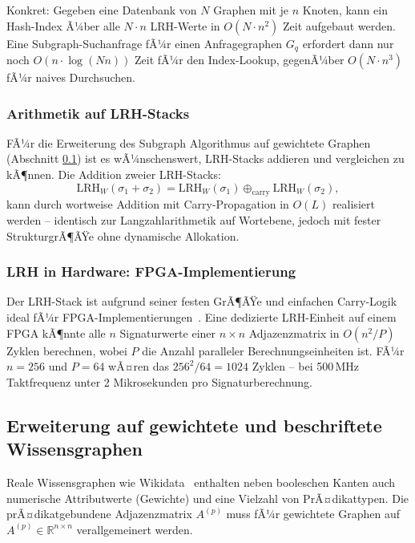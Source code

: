 ﻿\documentclass[a4paper,12pt]{article}
\theoremstyle{definition}
\begin{document}
Konkret: Gegeben eine Datenbank von $N$ Graphen mit je $n$ Knoten, kann ein
Hash-Index Ã¼ber alle $N \cdot n$ LRH-Werte in $O(N \cdot n^2)$ Zeit aufgebaut werden.
Eine Subgraph-Suchanfrage fÃ¼r einen Anfragegraphen $G_q$ erfordert dann nur noch
$O(n \cdot \log(Nn))$ Zeit fÃ¼r den Index-Lookup, gegenÃ¼ber $O(N \cdot n^3)$ fÃ¼r
naives Durchsuchen.

\subsubsection{Arithmetik auf LRH-Stacks}

FÃ¼r die Erweiterung des Subgraph Algorithmus auf gewichtete Graphen (Abschnitt
\ref{sec:ausblick_gewichtet}) ist es wÃ¼nschenswert, LRH-Stacks addieren und
vergleichen zu kÃ¶nnen. Die Addition zweier LRH-Stacks:
\[
  \mathrm{LRH}_W(\sigma_1 + \sigma_2) = \mathrm{LRH}_W(\sigma_1)
  \oplus_{\mathrm{carry}} \mathrm{LRH}_W(\sigma_2),
\]
kann durch wortweise Addition mit Carry-Propagation in $O(L)$ realisiert werden --
identisch zur Langzahlarithmetik auf Wortebene, jedoch mit fester StrukturgrÃ¶ÃŸe
ohne dynamische Allokation.

\subsubsection{LRH in Hardware: FPGA-Implementierung}

Der LRH-Stack ist aufgrund seiner festen GrÃ¶ÃŸe und einfachen Carry-Logik ideal
fÃ¼r FPGA-Implementierungen~\cite{vhdl2019}. Eine dedizierte LRH-Einheit auf einem
FPGA kÃ¶nnte alle $n$ Signaturwerte einer $n \times n$ Adjazenzmatrix in $O(n^2 / P)$
Zyklen berechnen, wobei $P$ die Anzahl paralleler Berechnungseinheiten ist.
FÃ¼r $n=256$ und $P=64$ wÃ¤ren das $256^2 / 64 = 1024$ Zyklen -- bei 500\,MHz
Taktfrequenz unter 2 Mikrosekunden pro Signaturberechnung.

\subsection{Erweiterung auf gewichtete und beschriftete Wissensgraphen}
\label{sec:ausblick_gewichtet}

Reale Wissensgraphen wie Wikidata~\cite{vrandecic2014} enthalten neben booleschen
Kanten auch numerische Attributwerte (Gewichte) und eine Vielzahl von PrÃ¤dikattypen.
Die prÃ¤dikatgebundene Adjazenzmatrix $A^{(p)}$ muss fÃ¼r gewichtete Graphen auf
$A^{(p)} \in \mathbb{R}^{n \times n}$ verallgemeinert werden.
\end{document}
